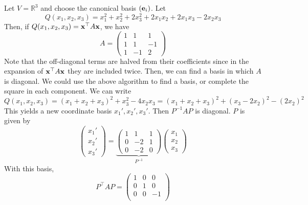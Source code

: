 \documentclass[a4paper]{article}
\begin{document}
\begin{example}
	Let \( V = \mathbb R^3 \) and choose the canonical basis \( ({\bf e}_i) \).
	Let
	\[
		Q(x_1, x_2, x_3) = x_1^2 + x_2^2 + 2x_3^2 + 2x_1 x_2 + 2x_1 x_3 - 2x_2 x_3
	\]
	Then, if \( Q(x_1, x_2, x_3) = {\bf x}^\top A {\bf x} \), we have
	\[
		A = \begin{pmatrix}
			1 & 1  & 1  \\
			1 & 1  & -1 \\
			1 & -1 & 2
		\end{pmatrix}
	\]
	Note that the off-diagonal terms are halved from their coefficients since in the expansion of \( {\bf x}^\top A {\bf x} \) they are included twice.
	Then, we can find a basis in which \( A \) is diagonal.
	We could use the above algorithm to find a basis, or complete the square in each component.
	We can write
	\[
		Q(x_1, x_2, x_3) = (x_1 + x_2 + x_3)^2 + x_3^2 - 4 x_2 x_3 = (x_1 + x_2 + x_3)^2 + (x_3 - 2x_2)^2 - (2x_2)^2
	\]
	This yields a new coordinate basis \( x_1', x_2', x_3' \).
	Then \( P^{-1} A P \) is diagonal.
	\( P \) is given by
	\[
		\begin{pmatrix} x_1' \\ x_2' \\ x_3' \end{pmatrix} = \underbrace{\begin{pmatrix} 1 & 1 & 1 \\ 0 & -2 & 1 \\ 0 & -2 & 0 \end{pmatrix}}_{P^{-1}} \begin{pmatrix} x_1 \\ x_2 \\ x_3 \end{pmatrix}
	\]
	With this basis, 
	\[
		P ^\top A P = \begin{pmatrix}
			1 & 0 &  0 \\
			0 & 1 &  0 \\
			0 & 0 &  -1 \\
		\end{pmatrix}
	\]
\end{example}
\end{document}
